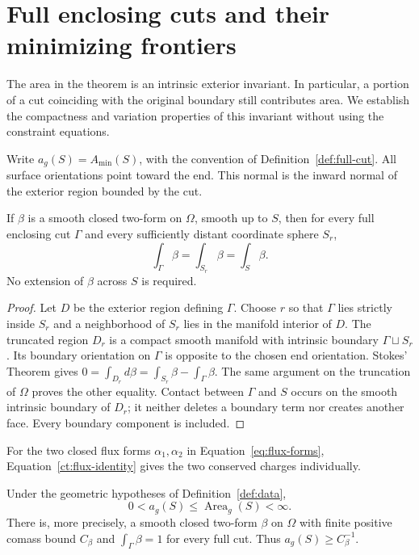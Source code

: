 \section{Full enclosing cuts and their minimizing frontiers}
\label{ct:section}
\label{sec:cuts}

The area in the theorem is an intrinsic exterior invariant. In particular,
a portion of a cut coinciding with the original boundary still contributes
area. We establish the compactness and variation properties of this
invariant without using the constraint equations.

Write $a_g(S)=A_{\min}(S)$, with the convention of
Definition~\ref{def:full-cut}. All surface orientations point toward the
end. This normal is the inward normal of the exterior region bounded
by the cut.

\begin{lemma}
\label{ct:flux}
If $\beta$ is a smooth closed two-form on $\Omega$, smooth up to $S$, then
for every full enclosing cut $\Gamma$ and every sufficiently distant
coordinate sphere $S_r$,
\begin{equation}
\label{ct:flux-identity}
 \int_\Gamma\beta=\int_{S_r}\beta=\int_S\beta.
\end{equation}
No extension of $\beta$ across $S$ is required.
\end{lemma}

\begin{proof}
Let $D$ be the exterior region defining $\Gamma$. Choose $r$ so that
$\Gamma$ lies strictly inside $S_r$ and a neighborhood of $S_r$ lies in
the manifold interior of $D$. The truncated region $D_r$ is a compact
smooth manifold with intrinsic boundary $\Gamma\sqcup S_r$. Its boundary
orientation on $\Gamma$ is opposite to the chosen end orientation.
Stokes' Theorem gives
$0=\int_{D_r}d\beta=\int_{S_r}\beta-\int_\Gamma\beta$.
The same argument on the truncation of $\Omega$ proves the other
equality. Contact between $\Gamma$ and $S$ occurs on the smooth intrinsic
boundary of $D_r$; it neither deletes a boundary term nor creates another
face. Every boundary component is included.
\end{proof}

For the two closed flux forms $\alpha_1,\alpha_2$ in
Equation~\ref{eq:flux-forms}, Equation~\ref{ct:flux-identity} gives the two
conserved charges individually.

\begin{proposition}
\label{ct:full-cut-positive}
Under the geometric hypotheses of Definition~\ref{def:data},
\begin{equation}
\label{ct:positive-area}
 0<a_g(S)\leq\operatorname{Area}_g(S)<\infty.
\end{equation}
There is, more precisely, a smooth closed two-form $\beta$ on $\Omega$
with finite positive comass bound $C_\beta$ and
$\int_\Gamma\beta=1$ for every full cut. Thus $a_g(S)\geq C_\beta^{-1}$.
\end{proposition}

